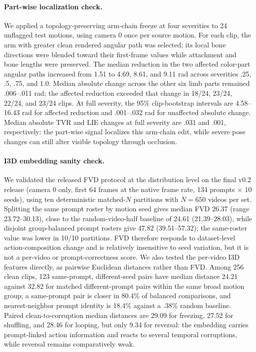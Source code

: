 \documentclass[10pt,twocolumn,letterpaper]{article}
\begin{document}
\paragraph{Part-wise localization check.} We applied a topology-preserving arm-chain freeze at four
severities to 24 unflagged test motions, using camera 0 once per source motion. For each clip, the arm with
greater clean rendered angular path was selected; its local bone directions were blended toward their
first-frame values while attachment and bone lengths were preserved. The median reduction in the two
affected color-part angular paths increased from 1.51 to 4.69, 8.61, and 9.11 rad across severities .25,
.5, .75, and 1.0. Median absolute change across the other six limb parts remained .006--.011 rad; the
affected reduction exceeded that change in 18/24, 23/24, 22/24, and 23/24 clips. At full severity, the
95\% clip-bootstrap intervals are 4.58--16.43 rad for affected reduction and .001--.032 rad for unaffected
absolute change. Median absolute TVR and LIE changes at full severity are .031 and .001, respectively: the
part-wise signal localizes this arm-chain edit, while severe pose changes can still alter visible topology
through occlusion.

\paragraph{I3D embedding sanity check.} We validated the released FVD protocol at the distribution level on
the final v0.2 release (camera 0 only, first 64 frames at the native frame rate, 134 prompts $\times$ 10
seeds), using ten deterministic matched-$N$ partitions with $N{=}650$ videos per set. Splitting the same
prompt roster by motion seed gives median FVD 26.37 (range 23.72--30.13), close to the random-video-half
baseline of 24.61 (21.39--28.03), while disjoint group-balanced prompt rosters give 47.82 (39.51--57.32);
the same-roster value was lower in 10/10 partitions. FVD therefore responds to dataset-level
action-composition change and is relatively insensitive to seed variation, but it is not a per-video or
prompt-correctness score. We also tested the per-video I3D features directly, as pairwise Euclidean
distances rather than FVD. Among 256 clean clips, 123 same-prompt, different-seed pairs have median
distance 24.21 against 32.82 for matched different-prompt pairs within the same broad motion group; a
same-prompt pair is closer in 80.4\% of balanced comparisons, and nearest-neighbor prompt identity is
18.4\% against a .38\% random baseline. Paired clean-to-corruption median distances are 29.09 for freezing,
27.52 for shuffling, and 28.46 for looping, but only 9.34 for reversal: the embedding carries prompt-linked
action information and reacts to several temporal corruptions, while reversal remains comparatively weak.
\end{document}
